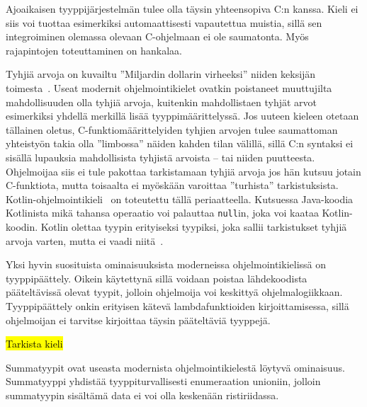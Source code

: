 Ajoaikaisen tyyppijärjestelmän tulee olla täysin yhteensopiva C:n kanssa. Kieli
ei siis voi tuottaa esimerkiksi automaattisesti vapautettua muistia, sillä sen
integroiminen olemassa olevaan C-ohjelmaan ei ole saumatonta. Myös rajapintojen
toteuttaminen on hankalaa.

Tyhjiä arvoja on kuvailtu ''Miljardin dollarin virheeksi'' niiden keksijän
toimesta~\citep{billiondollars}. Useat modernit ohjelmointikielet ovatkin
poistaneet muuttujilta mahdollisuuden olla tyhjiä arvoja, kuitenkin
mahdollistaen tyhjät arvot esimerkiksi yhdellä merkillä lisää
tyyppimäärittelyssä. Jos uuteen kieleen otetaan tällainen oletus,
C-funktiomäärittelyiden tyhjien arvojen tulee saumattoman yhteistyön takia olla
''limbossa'' näiden kahden tilan välillä, sillä C:n syntaksi ei sisällä
lupauksia mahdollisista tyhjistä arvoista -- tai niiden puutteesta. Ohjelmoijaa
siis ei tule pakottaa tarkistamaan tyhjiä arvoja jos hän kutsuu jotain
C-funktiota, mutta toisaalta ei myöskään varoittaa ''turhista'' tarkistuksista.
Kotlin-ohjelmointikieli~\citep{kotlin} on toteutettu tällä periaatteella.
Kutsuessa Java-koodia Kotlinista mikä tahansa operaatio voi palauttaa
\texttt{null}in, joka voi kaataa Kotlin-koodin. Kotlin olettaa tyypin
erityiseksi tyypiksi, joka sallii tarkistukset tyhjiä arvoja varten, mutta ei
vaadi niitä~\citep{kotlinnullability}.


Yksi hyvin suosituista ominaisuuksista moderneissa ohjelmointikielissä on
tyyppipäättely. Oikein käytettynä sillä voidaan poistaa lähdekoodista
pääteltävissä olevat tyypit, jolloin ohjelmoija voi keskittyä
ohjelmalogiikkaan. Tyyppipäättely onkin erityisen kätevä lambdafunktioiden
kirjoittamisessa, sillä ohjelmoijan ei tarvitse kirjoittaa täysin pääteltäviä
tyyppejä.

\hl{Tarkista kieli}

Summatyypit ovat useasta modernista
ohjelmointikielestä löytyvä ominaisuus. Summatyyppi yhdistää tyyppiturvallisesti
enumeraation unioniin, jolloin summatyypin sisältämä data ei voi olla keskenään
ristiriidassa.

